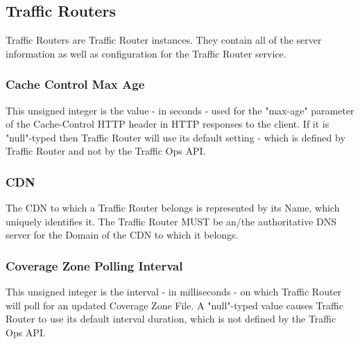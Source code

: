 %
%

\subsection{Traffic Routers}
Traffic Routers are Traffic Router instances. They contain all of the server
information as well as configuration for the Traffic Router service.

\subsubsection{Cache Control Max Age}
This unsigned integer is the value - in seconds - used for the "max-age"
parameter of the Cache-Control HTTP header in HTTP responses to the client. If
it is "null"-typed then Traffic Router will use its default setting - which is
defined by Traffic Router and not by the Traffic Ops API.

\subsubsection{CDN}
The CDN to which a Traffic Router belongs is represented by its Name, which
uniquely identifies it. The Traffic Router MUST be an/the authoritative DNS
server for the Domain of the CDN to which it belongs.

\subsubsection{Coverage Zone Polling Interval}
This unsigned integer is the interval - in milliseconds - on which Traffic
Router will poll for an updated Coverage Zone File. A "null"-typed value causes
Traffic Router to use its default interval duration, which is not defined by the
Traffic Ops API.

